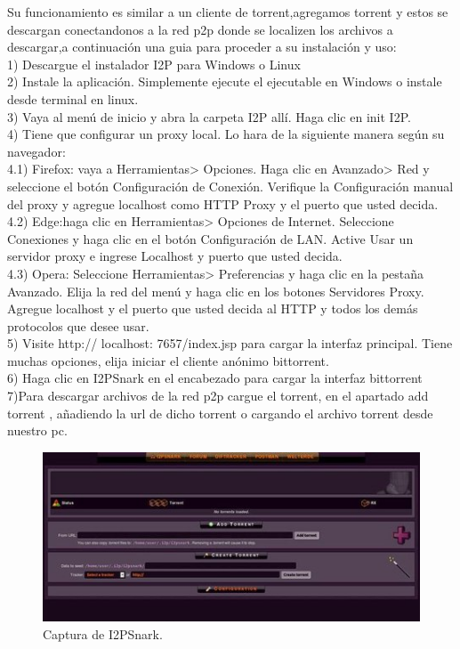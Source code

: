 \documentclass{article}
\begin{document}
Su funcionamiento es similar a un cliente de torrent,agregamos torrent y estos se descargan conectandonos a la red p2p donde se localizen los archivos a descargar,a continuación 
una guia para proceder a su instalación y uso:
\\

1) Descargue el instalador I2P para Windows o Linux
\\

2) Instale la aplicación. Simplemente ejecute el ejecutable en Windows o instale desde terminal en linux.
\\

3) Vaya al menú de inicio y abra la carpeta I2P allí. Haga clic en init I2P.
\\

4) Tiene que configurar un proxy local. Lo hara de la siguiente manera según su navegador:
\\

4.1) Firefox: vaya a Herramientas> Opciones. Haga clic en Avanzado> Red y seleccione el botón Configuración de Conexión. Verifique la Configuración manual del proxy y agregue localhost como HTTP Proxy y el puerto que usted decida.
\\

4.2) Edge:haga clic en Herramientas> Opciones de Internet. Seleccione Conexiones  y haga clic en el botón Configuración de LAN. Active Usar un servidor proxy e ingrese Localhost y puerto que usted decida.
\\

4.3) Opera: Seleccione Herramientas> Preferencias y haga clic en la pestaña Avanzado. Elija la red del menú y haga clic en los botones Servidores Proxy. Agregue localhost y el puerto que usted decida al HTTP y todos los demás protocolos que desee usar.
\\

5) Visite http:// localhost: 7657/index.jsp para cargar la interfaz principal. Tiene muchas opciones, elija iniciar el cliente anónimo bittorrent.
\\

6) Haga clic en I2PSnark en el encabezado para cargar la interfaz bittorrent
\\

7)Para descargar archivos de la red p2p  cargue el torrent, en el apartado add torrent , añadiendo la url de dicho torrent o cargando el archivo torrent desde nuestro pc.
\\

\begin{figure}[H]
    \centering
    \includegraphics[]{media/i2p_3.jpg}
    \caption{Captura de I2PSnark.}
    \label{fig4}
\end{figure}
\end{document}
